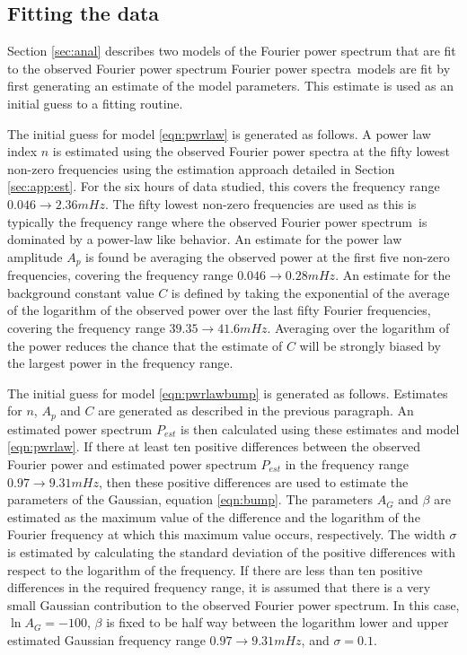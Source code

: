 \documentclass[onecolumn]{emulateapj}
\newcommand{\PS}{power spectrum}
\newcommand{\PA}{power spectra}
\newcommand{\Fps}{Fourier \PS}
\newcommand{\Fpa}{Fourier \PA}
\begin{document}
\subsection{Fitting the data}\label{sec:app:fit}
Section \ref{sec:anal} describes two models of the Fourier power
spectrum that are fit to the observed Fourier power spectrum
\Fpa\ models are fit by first generating an estimate of the model
parameters.  This estimate is used as an initial guess to a fitting
routine.

The initial guess for model \ref{eqn:pwrlaw} is generated as follows.
A power law index $n$ is estimated using the observed Fourier power
spectra at the fifty lowest non-zero frequencies using the estimation
approach detailed in Section \ref{sec:app:est}.  For the six hours of
data studied, this covers the frequency range $0.046\rightarrow2.36
mHz$.  The fifty lowest non-zero frequencies are used as this is
typically the frequency range where the observed \Fps\ is dominated by
a power-law like behavior.  An estimate for the power law amplitude
$A_{p}$ is found be averaging the observed power at the first five
non-zero frequencies, covering the frequency range
$0.046\rightarrow0.28 mHz$.  An estimate for the background constant
value $C$ is defined by taking the exponential of the average of the
logarithm of the observed power over the last fifty Fourier
frequencies, covering the frequency range $39.35\rightarrow41.6 mHz$.
Averaging over the logarithm of the power reduces the chance that the
estimate of $C$ will be strongly biased by the largest power in the
frequency range.

The initial guess for model \ref{eqn:pwrlawbump} is generated as
follows.  Estimates for $n$, $A_{p}$ and $C$ are generated as
described in the previous paragraph.  An estimated power spectrum
$P_{est}$ is then calculated using these estimates and model
\ref{eqn:pwrlaw}.  If there at least ten positive differences between
the observed Fourier power and estimated power spectrum $P_{est}$ in
the frequency range $0.97 \rightarrow 9.31 mHz$, then these positive
differences are used to estimate the parameters of the Gaussian,
equation \ref{eqn:bump}.  The parameters $A_{G}$ and $\beta$ are
estimated as the maximum value of the difference and the logarithm of
the Fourier frequency at which this maximum value occurs,
respectively.  The width $\sigma$ is estimated by calculating the
standard deviation of the positive differences with respect to the
logarithm of the frequency.  If there are less than ten positive
differences in the required frequency range, it is assumed that there
is a very small Gaussian contribution to the observed \Fps.  In this
case, $\ln A_{G}=-100$, $\beta$ is fixed to be half way between the
logarithm lower and upper estimated Gaussian frequency range
$0.97 \rightarrow 9.31 mHz$, and $\sigma = 0.1$.
\end{document}
